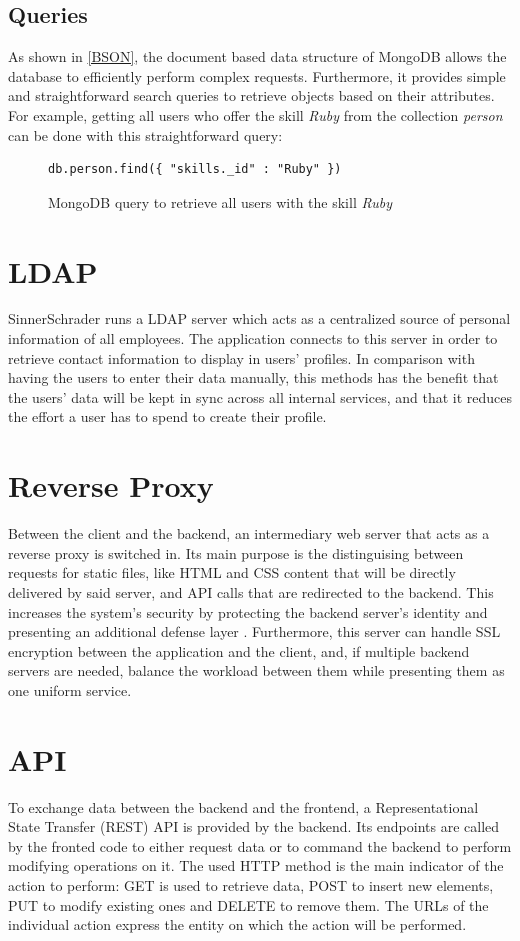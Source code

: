 \subsection{Queries}
As shown in \ref{BSON}, the document based data structure of MongoDB allows the database to efficiently perform complex requests. Furthermore, it provides simple and straightforward search queries to retrieve objects based on their attributes. For example, getting all users who offer the skill \textit{Ruby} from the collection \textit{person} can be done with this straightforward query:
\begin{figure}
\begin{lstlisting}[language=JS]
db.person.find({ "skills._id" : "Ruby" })
\end{lstlisting}
\caption[Example Database Query]{MongoDB query to retrieve all users with the skill \textit{Ruby}}
\end{figure}

\section{LDAP}
SinnerSchrader runs a LDAP server which acts as a centralized source of personal information of all employees. The application connects to this server in order to retrieve contact information to display in users' profiles. In comparison with having the users to enter their data manually, this methods has the benefit that the users' data will be kept in sync across all internal services, and that it reduces the effort a user has to spend to create their profile.

\section{Reverse Proxy}
Between the client and the backend, an intermediary web server that acts as a reverse proxy is switched in. Its main purpose is the distinguising between requests for static files, like HTML and CSS content that will be directly delivered by said server, and API calls that are redirected to the backend. This increases the system's security by protecting the backend server's identity and presenting an additional defense layer \cite{NGINX}. Furthermore, this server can handle SSL encryption between the application and the client, and, if multiple backend servers are needed, balance the workload between them while presenting them as one uniform service.

\section{API}
To exchange data between the backend and the frontend, a Representational State Transfer (REST) API is provided by the backend. Its endpoints are called by the fronted code to either request data or to command the backend to perform modifying operations on it.
The used HTTP method is the main indicator of the action to perform: GET is used to retrieve data, POST to insert new elements, PUT to modify existing ones and DELETE to remove them. The URLs of the individual action express the entity on which the action will be performed.

